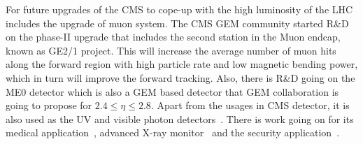 For future upgrades of the CMS to cope-up with the high luminosity of the LHC includes the upgrade of muon system. The CMS GEM community started R\&D on the phase-II upgrade that includes the second station in the Muon endcap, known as GE2/1 project. This will increase the average number of muon hits along the forward region with high particle rate and low magnetic bending power, which in turn will improve the forward tracking. Also, there is R\&D going on the ME0 detector which is also a GEM based detector that GEM collaboration is going to propose for $2.4 \leq \eta \leq 2.8$. Apart from the usages in CMS detector, it is also used as the UV and visible photon detectors~\cite{Sauli2016}. There is work going on for its medical application~\cite{Wallmark2001,Tsyganov2008}, advanced X-ray monitor~\cite{Remillard2000} and the security application~\cite{Gnanvo2010}.


